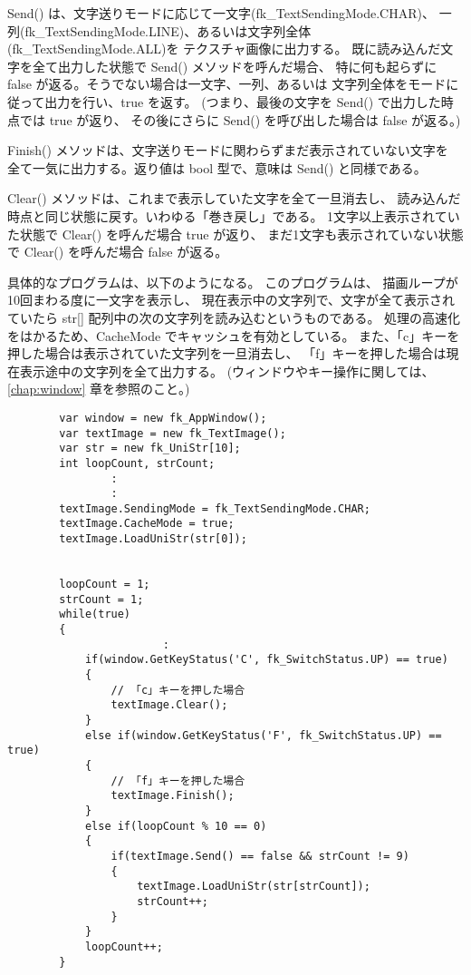 Send() は、文字送りモードに応じて一文字(fk\_TextSendingMode.CHAR)、
一列(fk\_TextSendingMode.LINE)、あるいは文字列全体(fk\_TextSendingMode.ALL)を
テクスチャ画像に出力する。
既に読み込んだ文字を全て出力した状態で Send() メソッドを呼んだ場合、
特に何も起らずに false が返る。そうでない場合は一文字、一列、あるいは
文字列全体をモードに従って出力を行い、true を返す。
(つまり、最後の文字を Send() で出力した時点では true が返り、
その後にさらに Send() を呼び出した場合は false が返る。)

Finish() メソッドは、文字送りモードに関わらずまだ表示されていない文字を
全て一気に出力する。返り値は bool 型で、意味は Send() と同様である。

Clear() メソッドは、これまで表示していた文字を全て一旦消去し、
読み込んだ時点と同じ状態に戻す。いわゆる「巻き戻し」である。
1文字以上表示されていた状態で Clear() を呼んだ場合 true が返り、
まだ1文字も表示されていない状態で Clear() を呼んだ場合 false が返る。

具体的なプログラムは、以下のようになる。
このプログラムは、
描画ループが10回まわる度に一文字を表示し、
現在表示中の文字列で、文字が全て表示されていたら
str[] 配列中の次の文字列を読み込むというものである。
処理の高速化をはかるため、CacheMode でキャッシュを有効としている。
また、「c」キーを押した場合は表示されていた文字列を一旦消去し、
「f」キーを押した場合は現在表示途中の文字列を全て出力する。
(ウィンドウやキー操作に関しては、\ref{chap:window} 章を参照のこと。) \\

\begin{breakbox}
\begin{verbatim}
        var window = new fk_AppWindow();
        var textImage = new fk_TextImage();
        var str = new fk_UniStr[10];
        int loopCount, strCount;
                :
                :
        textImage.SendingMode = fk_TextSendingMode.CHAR;
        textImage.CacheMode = true;
        textImage.LoadUniStr(str[0]);


        loopCount = 1;
        strCount = 1;
        while(true)
        {
                        :
            if(window.GetKeyStatus('C', fk_SwitchStatus.UP) == true)
            {
                // 「c」キーを押した場合
                textImage.Clear();
            }
            else if(window.GetKeyStatus('F', fk_SwitchStatus.UP) == true)
            {
                // 「f」キーを押した場合
                textImage.Finish();
            }
            else if(loopCount % 10 == 0)
            {
                if(textImage.Send() == false && strCount != 9)
                {
                    textImage.LoadUniStr(str[strCount]);
                    strCount++;
                }
            }
            loopCount++;
        }
\end{verbatim}
\end{breakbox}

